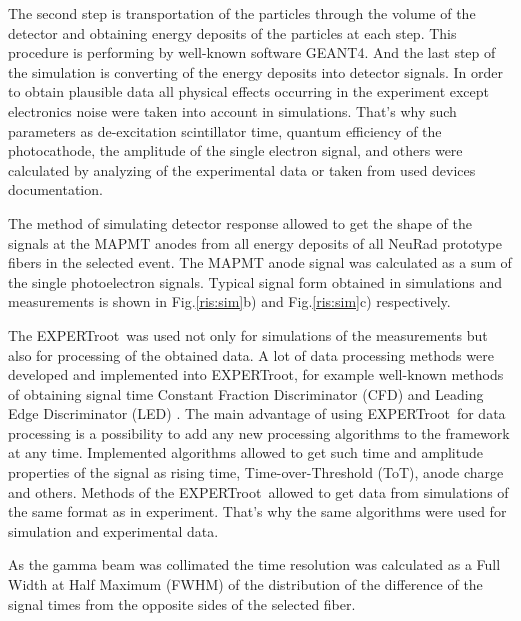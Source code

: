 \documentclass{webofc}
\newcommand{\er}{\textmd{EXPERTroot}}
\begin{document}

\color{red}The second step is transportation of the particles through the volume of the detector and obtaining energy deposits of the particles at each step.\color{black} This procedure is performing by well-known software GEANT4. And the last step of the simulation is converting of the energy deposits into detector signals.
In order to obtain plausible data all physical effects occurring in the experiment except electronics noise were taken into account in simulations.
That's why such parameters as de-excitation scintillator time, quantum efficiency of the photocathode, the amplitude of the single electron signal, and others were calculated by analyzing of the experimental data or taken from used devices documentation.

The method of simulating detector response allowed to get the shape of the signals at the MAPMT anodes from all energy deposits of all NeuRad prototype fibers in the selected event. The MAPMT anode signal was calculated as a sum of the single photoelectron signals. Typical signal form obtained in simulations and measurements is shown in Fig.\ref{ris:sim}b) and Fig.\ref{ris:sim}c) respectively.

The \er\, was used not only for simulations of the measurements but also for processing of the obtained data.
A lot of data processing methods were developed and implemented into \er, for example well-known methods of obtaining signal time Constant Fraction Discriminator (CFD) and Leading Edge Discriminator (LED) \cite{diplom}.
The main advantage of using \er\, for data processing is a possibility to add any new processing algorithms to the framework at any time. 
Implemented algorithms allowed to get such time and amplitude properties of the signal as rising time, Time-over-Threshold (ToT), anode charge and others. 
Methods of the \er\, allowed to get data from simulations of the same format as in experiment. That's why the same algorithms were used for simulation and experimental data.

\color{red}
As the gamma beam was collimated the time resolution was calculated as a Full Width at Half Maximum (FWHM) of the distribution of the difference of the signal times from the opposite sides of the selected fiber. 
\color{black}
\end{document}
